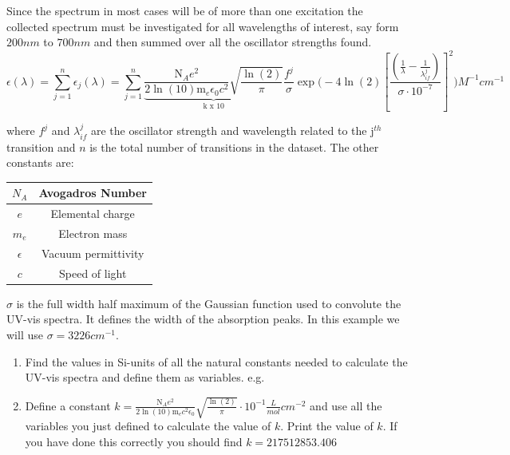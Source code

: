 \documentclass{article}
\begin{document}
Since the spectrum in most cases will be of more than one excitation the collected spectrum must be investigated for all wavelengths of interest, say form $200\si{nm}$ to $700\si{nm}$ and then summed over all the oscillator strengths found.
\begin{equation}
\epsilon(\lambda)=\sum_{j=1}^n \epsilon_j(\lambda)=\sum_{j=1}^n  \underbrace{\frac{\text{N}_A\si{e^2}}{2\ln(10) \text{m}_e \epsilon_0\si{c^2}} \sqrt{\frac{\ln(2)}{\pi}}}_\text{k x 10} \frac{f^j}{\sigma} \exp{\Bigg(-4 \ln(2) \left[\frac{\left(\frac{1}{\lambda}-\frac{1}{\lambda_{if}^j}\right)}{\sigma\cdot 10^{-7}}\right]^2}\Bigg) \si{M^{-1}cm^{-1}} \label{eq_uv_vis}
\end{equation}

where $f^j$ and $\lambda_{if}^j$ are the oscillator strength and wavelength related to the $\text{j}^{th}$ transition and $n$ is the total number of transitions in the dataset. The other constants are:

\begin{center}
\begin{tabular}{|c|c|}
\hline 
$N_A$ & Avogadros Number \\ 
\hline 
$e$ & Elemental charge \\ 
\hline 
$m_e$ & Electron mass \\ 
\hline 
$\epsilon$ & Vacuum permittivity \\ 
\hline 
$c$ & Speed of light \\ 
\hline 
\end{tabular} 
\end{center}



$\sigma$ is the full width half maximum of the Gaussian function used to convolute the UV-vis spectra. It defines the width of the absorption peaks. In this example we will use $\sigma = 3226 \si{cm^{-1}}$.
\begin{enumerate}
\item Find the values in Si-units of all the natural constants needed to calculate the UV-vis spectra and define them as variables. e.g. \\

\item Define a constant $k=\frac{\text{N}_A\si{e^2}}{2\ln(10) \text{m}_e \si{c^2}  \epsilon_0}\sqrt{\frac{\ln(2)}{\pi}}\cdot 10^{-1} \frac{\si{L}}{\si{mol}}\si{cm^{-2}}$ and use all the variables you just defined to calculate the value of $k$. Print the value of $k$. If you have done this correctly you should find
$k=217512853.406$
\end{enumerate}
\end{document}
